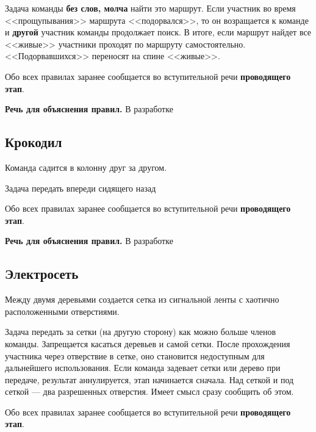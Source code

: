 \documentclass[a4paper, 14pt]{extarticle}
\theoremstyle{definition}
\begin{document}
\par Задача команды \textbf{без слов, молча} найти это маршрут. Если участник во время <<прощупывания>> маршрута <<подорвался>>, то он возращается к команде и \textbf{другой} участник команды продолжает поиск. В итоге, если маршрут найдет все <<живые>> участники проходят по маршруту самостоятельно. <<Подорвавшихся>> переносят на спине <<живые>>.

\par Обо всех правилах заранее сообщается во вступительной речи \textbf{проводящего этап}.

\par \textbf{Речь для объяснения правил.} В разработке


\subsection{Крокодил}

\par Команда садится в колонну друг за другом.

\par Задача передать впереди сидящего назад

\par Обо всех правилах заранее сообщается во вступительной речи \textbf{проводящего этап}.

\par \textbf{Речь для объяснения правил.} В разработке


\subsection{Электросеть}

\par Между двумя деревьями создается сетка из сигнальной ленты с хаотично расположенными отверстиями.

\par Задача передать за сетки (на другую сторону) как можно больше членов команды. Запрещается касаться деревьев и самой сетки. После прохождения участника через отверствие в сетке, оно становится недоступным для дальнейшего использования. Если команда задевает сетки или дерево при передаче, результат аннулируется, этап начинается сначала. Над сеткой и под сеткой --- два разрешенных отверстия. Имеет смысл сразу сообщить об этом.

\par Обо всех правилах заранее сообщается во вступительной речи \textbf{проводящего этап}.
\end{document}
